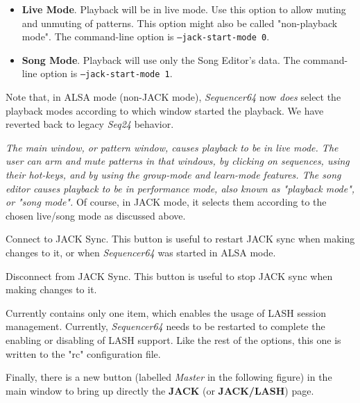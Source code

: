    \begin{itemize}
      \item \textbf{Live Mode}.
         Playback will be in live mode.  Use this option to allow muting and
         unmuting of patterns.  This option might also be called "non-playback
         mode".
         The command-line option is \texttt{--jack-start-mode 0}.
      \item \textbf{Song Mode}.
         Playback will use only the Song Editor's data.
         The command-line option is \texttt{--jack-start-mode 1}.
   \end{itemize}

   Note that, in ALSA mode (non-JACK mode), \textsl{Sequencer64} 
   now \textsl{does} select the playback modes
   according to which window started the playback.
   We have reverted back to legacy \textsl{Seq24} behavior.

   \textsl{The main window, or pattern
   window, causes playback to be in live mode.  The user can arm and mute
   patterns in that windows, by clicking on sequences, using their hot-keys,
   and by using the group-mode and learn-mode features.
   The song editor causes playback to be in performance mode, also known as
   "playback mode", or "song mode".}
   Of course, in JACK mode,
   it selects them according to the chosen live/song mode as discussed above.

   Connect to JACK Sync.
   This button is useful to restart JACK sync when making changes to it,
   or when \textsl{Sequencer64} was started in ALSA mode.

   Disconnect from JACK Sync.
   This button is useful to stop JACK sync when making changes to it.

   Currently contains only one item, which enables the usage of LASH session
   management.  Currently, \textsl{Sequencer64} needs to be restarted to
   complete the enabling or disabling of LASH support.  Like the rest of the
   options, this one is written to the "rc" configuration file.

   Finally, there is a new button (labelled \textsl{Master} in the following
   figure) in the main window to bring up directly the
   \textbf{JACK} (or \textbf{JACK/LASH}) page.

